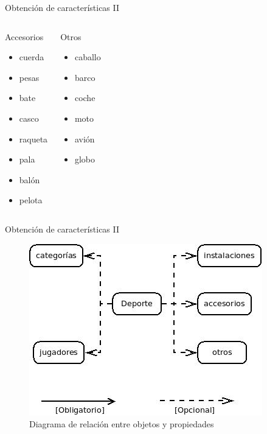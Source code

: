 \begin{frame}{Obtención de características II}
 \begin{columns}[t]
  \begin{block}{Accesorios}
   	\begin{itemize}
	\item cuerda
	\item pesas
	\item bate
	\item casco
	\item raqueta
	\item pala
	\item balón
	\item pelota
	\end{itemize}
  \end{block}
  \begin{block}{Otros}
  	\begin{itemize}
	\item caballo
	\item barco
	\item coche
	\item moto
	\item avión
	\item globo
	\end{itemize}
  \end{block}
 \end{columns}
\end{frame}


\begin{frame}{Obtención de características II}
\begin{figure} [ht]
\begin {center}
\includegraphics[scale = 0.4]{./../doc/Deportes.jpeg}
\caption{Diagrama de relación entre objetos y propiedades}
\end {center}
\end{figure}
\end{frame}
